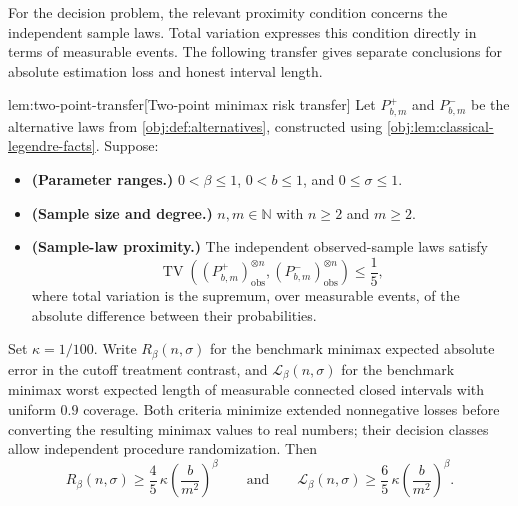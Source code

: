 \documentclass[11pt]{article}
\begin{document}
For the decision problem, the relevant proximity condition concerns the independent sample laws. Total variation  expresses this condition directly in terms of measurable events. The following transfer gives separate conclusions for absolute estimation loss and honest interval length.

\begin{lemmav}{lem:two-point-transfer}[Two-point minimax risk transfer]
Let \(P^+_{b,m}\) and \(P^-_{b,m}\) be the alternative laws from \cref{obj:def:alternatives}, constructed using \cref{obj:lem:classical-legendre-facts}. Suppose:
\begin{itemize}
\item \textbf{(Parameter ranges.)} \(0<\beta\le1\), \(0<b\le1\), and \(0\le\sigma\le1\).
\item \textbf{(Sample size and degree.)} \(n,m\in\mathbb N\) with \(n\ge2\) and \(m\ge2\).
\item \textbf{(Sample-law proximity.)} The independent observed-sample laws satisfy
\[
\operatorname{TV}\!\left(
(P^+_{b,m})_{\mathrm{obs}}^{\otimes n},
(P^-_{b,m})_{\mathrm{obs}}^{\otimes n}
\right)\le\frac15,
\]
where total variation is the supremum, over measurable events, of the absolute difference between their probabilities.
\end{itemize}
Set \(\kappa=1/100\). Write \(R_\beta(n,\sigma)\) for the benchmark minimax expected absolute error in the cutoff treatment contrast, and \(\mathcal L_\beta(n,\sigma)\) for the benchmark minimax worst expected length of measurable connected closed intervals with uniform \(0.9\) coverage. Both criteria minimize extended nonnegative losses before converting the resulting minimax values to real numbers; their decision classes allow independent procedure randomization. Then
\[
R_\beta(n,\sigma)\ge
\frac45\,\kappa\left(\frac{b}{m^2}\right)^\beta
\qquad\text{and}\qquad
\mathcal L_\beta(n,\sigma)\ge
\frac65\,\kappa\left(\frac{b}{m^2}\right)^\beta.
\]
\end{lemmav}
\end{document}
